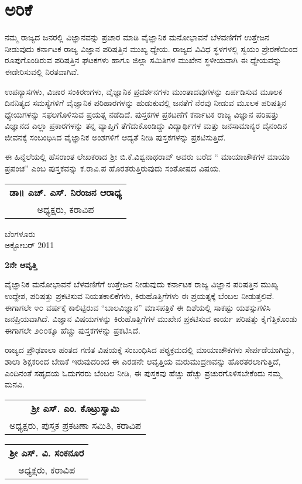 \chapter*{ಅರಿಕೆ}

\phantom{a}

\vskip  -1.2cm

ನಮ್ಮ ರಾಜ್ಯದ ಜನರಲ್ಲಿ ವಿಜ್ಞಾನವನ್ನು ಪ್ರಚಾರ ಮಾಡಿ ವೈಜ್ಞಾನಿಕ ಮನೋಭಾವನೆ ಬೆಳವಣಿಗೆಗೆ ಉತ್ತೇಜನ ನೀಡುವುದು ಕರ್ನಾಟಕ ರಾಜ್ಯ ವಿಜ್ಞಾನ ಪರಿಷತ್ತಿನ ಮುಖ್ಯ ಧ್ಯೇಯ. ರಾಜ್ಯದ ವಿವಿಧ ಸ್ಥಳಗಳಲ್ಲಿ ಸ್ವಯಂ ಪ್ರೇರಣೆಯಿಂದ ರೂಪುಗೊಂಡಿರುವ ಪರಿಷತ್ತಿನ ಘಟಕಗಳು ಹಾಗೂ ಜಿಲ್ಲಾ ಸಮಿತಿಗಳ ಮುಖೇನ ಸ್ಥಳೀಯವಾಗಿ ಈ ಧ್ಯೇಯವನ್ನು ಈಡೇರಿಸುವಲ್ಲಿ ನಿರತವಾಗಿವೆ.

ಉಪನ್ಯಾಸಗಳು, ವಿಚಾರ ಸಂಕಿರಣಗಳು, ವೈಜ್ಞಾನಿಕ ಪ್ರದರ್ಶನಗಳು ಮುಂತಾದವುಗಳನ್ನು ಏರ್ಪಡಿಸುವ ಮೂಲಕ ದಿನನಿತ್ಯದ ಸಮಸ್ಯೆಗಳಿಗೆ ವೈಜ್ಞಾನಿಕ ಪರಿಹಾರಗಳನ್ನು ಹುಡುಕುವಲ್ಲಿ ಜನತೆಗೆ ನೆರವು ನೀಡುವ ಮೂಲಕ ಪರಿಷತ್ತಿನ  ಧ್ಯೇಯಗಳನ್ನು ಸಫಲಗೊಳಿಸುವ ಪ್ರಯತ್ನ ನಡೆದಿದೆ. ಪುಸ್ತಕಗಳ ಪ್ರಕಟಣೆಗೆ ಕರ್ನಾಟಕ ರಾಜ್ಯ ವಿಜ್ಞಾನ ಪರಿಷತ್ತು ವಿಜ್ಞಾನದ ಎಲ್ಲಾ ಪ್ರಕಾರಗಳನ್ನು ತನ್ನ ವ್ಯಾಪ್ತಿಗೆ ತೆಗೆದುಕೊಂಡಿದ್ದು ವಿದ್ಯಾರ್ಥಿಗಳ ಮತ್ತು ಜನಸಾಮಾನ್ಯರ ದೈನಂದಿನ ಜೀವನಕ್ಕೆ ಸಂಬಂಧಿಸಿದ ವೈಜ್ಞಾನಿಕ ಅಂಶಗಳಿಗೆ ಆದ್ಯತೆ ನೀಡಿ ಪುಸ್ತಕಗಳನ್ನು ಪ್ರಕಟಿಸುತ್ತಿದೆ.

ಈ ಹಿನ್ನೆಲೆಯಲ್ಲಿ ಹೆಸರಾಂತ ಲೇಖಕರಾದ ಶ್ರೀ ಬಿ.ಕೆ.ವಿಶ್ವನಾಥರಾವ್​ ಅವರು ಬರೆದ “ ಮಾಯಾಚೌಕಗಳ ಮಾಯಾ ಪ್ರಪಂಚ” ಎಂಬ ಪುಸ್ತಕವನ್ನು ಕ.ರಾವಿ.ಪ ಹೊರತರುತ್ತಿರುವುದು ಸಂತೋಷದ ವಿಷಯ.

\medskip
\medskip

\begin{flushright}
\begin{tabular}{c}
{\bf ಡಾ॥ ಎಚ್. ಎಸ್. ನಿರಂಜನ ಆರಾಧ್ಯ} \\
ಅಧ್ಯಕ್ಷರು, ಕರಾವಿಪ
\end{tabular}
\end{flushright}

\noindent
ಬೆಂಗಳೂರು\\
ಅಕ್ಟೋಬರ್ {\rm  2011}\relax
\vfill
\eject

\begin{center}
{\bf 2ನೇ ಆವೃತ್ತಿ}
\end{center}

ವೈಜ್ಞಾನಿಕ ಮನೋಭಾವನೆ ಬೆಳವಣಿಗೆಗೆ ಉತ್ತೇಜನ ನೀಡುವುದು ಕರ್ನಾಟಕ ರಾಜ್ಯ ವಿಜ್ಞಾನ ಪರಿಷತ್ತಿನ ಮುಖ್ಯ ಉದ್ದೇಶ, ಪರಿಷತ್ತು ಪ್ರಕಟಿಸುವ ನಿಯತಕಾಲಿಕೆಗಳು, ಕಿರುಹೊತ್ತಿಗೆಗಳು ಈ ಪ್ರಯತ್ನಕ್ಕೆ ಬೆಂಬಲ ನೀಡುತ್ತಲಿವೆ. ಈಗಾಗಲೇ ೪೦ ವರ್ಷಕ್ಕೆ ಕಾಲಿಟ್ಟಿರುವ “ಬಾಲವಿಜ್ಞಾನ” ಮಾಸಪತ್ರಿಕೆ ಈ ದಿಶೆಯಲ್ಲಿ ಸಾಕಷ್ಟು ಯಶಸ್ಸುಗಳಿಸಿ ಜನಪ್ರಿಯವಾಗಿದೆ. ವಿಜ್ಞಾನ ವಿಷಯಗಳನ್ನು ಕಿರುಹೊತ್ತಿಗೆಗಳ ಮುಖೇನ ಪ್ರಕಟಿಸುವ ಕಾರ್ಯ ಪರಿಷತ್ತು ಕೈಗೆತ್ತಿಕೊಂಡು ಈಗಾಗಲೇ ೨೦೦ಕ್ಕೂ ಹೆಚ್ಚು ಪುಸ್ತಕಗಳನ್ನು  ಪ್ರಕಟಿಸಿದೆ. 

ರಾಜ್ಯದ ಪ್ರೌಢಶಾಲಾ ಹಂತದ ಗಣಿತ ವಿಷಯಕ್ಕೆ ಸಂಬಂಧಿಸಿದ ಪಠ್ಯಕ್ರಮದಲ್ಲಿ ಮಾಯಾಚೌಕಗಳು ಸೇರ್ಪಡೆಯಾಗಿದ್ದು, ಶಾಲಾ ಶಿಕ್ಷಕರಿಂದ ಬೇಡಿಕೆ ಇರುವುದರಿಂದ ಈ ಎರಡನೇ ಆವೃತ್ತಿಯ ಮರುಮುದ್ರಣವನ್ನು ಹೊರತರಲಾಗುತ್ತಿದೆ, ಎಂದಿನಂತೆ ಸಹೃದಯ ಓದುಗರರು ಬೆಂಬಲ ನೀಡಿ, ಈ ಪುಸ್ತಕವು ಹೆಚ್ಚು ಹೆಚ್ಚು ಪ್ರಚುರಗೊಳಿಸಬೇಕೆಂದು ನಮ್ಮ ಮನವಿ.

\medskip

\noindent
\begin{tabular}{c}
{\bf ಶ್ರೀ ಎಸ್. ಎಂ. ಕೊಟ್ರುಸ್ವಾಮಿ }\\
ಅಧ್ಯಕ್ಷರು, ಪುಸ್ತಕ ಪ್ರಕಟಣಾ ಸಮಿತಿ, ಕರಾವಿಪ
\end{tabular}
\begin{flushright}
\begin{tabular}{c}
{\bf ಶ್ರೀ ಎಸ್. ವಿ. ಸಂಕನೂರ}\\
ಅಧ್ಯಕ್ಷರು, ಕರಾವಿಪ
\end{tabular}
\end{flushright}

\newpage
